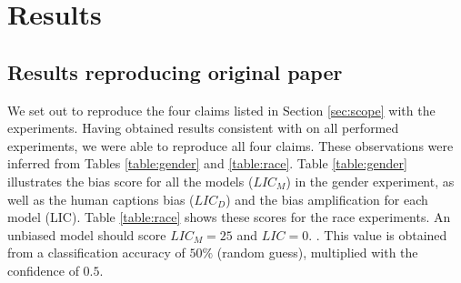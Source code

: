 \section{Results}
\label{sec:results}



\subsection{Results reproducing original paper} 

We set out to reproduce the four claims listed in Section \ref{sec:scope} with the experiments. Having obtained results consistent with \citeauthor{hirota} on all performed experiments, we were able to reproduce all four claims. These observations were inferred from Tables \ref{table:gender} and \ref{table:race}. Table \ref{table:gender} illustrates the bias score for all the models ($LIC_M$) in the gender experiment, as well as the human captions bias ($LIC_D$) and the bias amplification for each model (LIC). Table \ref{table:race} shows these scores for the race experiments. An unbiased model should score $LIC_M=25$ and $LIC=0$. \cite{hirota}. This value is obtained from a classification accuracy of $50\%$ (random guess), multiplied with the confidence of $0.5$.


